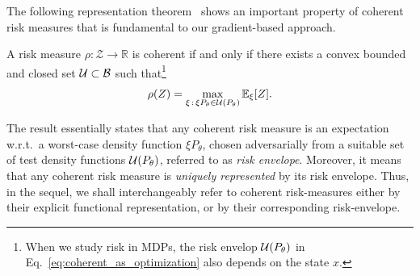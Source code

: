 \documentclass{article} %
\begin{document}
The following representation theorem~\cite{Shapiro2009} shows an important property of coherent risk measures that is fundamental to our gradient-based approach.
%
\begin{theorem}
\label{thm:rep}
A risk measure $\rho:\mathcal Z \rightarrow \mathbb R$ is coherent if and only if there exists a convex bounded and closed set ${\mathcal{U}} \subset \mathcal B$ such that\footnote{When we study risk in MDPs, the risk envelop ${\mathcal{U}}(P_\theta)$ in Eq.~\ref{eq:coherent_as_optimization} also depends on the state $x$.
}%
%
\begin{equation}
\label{eq:coherent_as_optimization}
\rho(Z)=\max_{\xi\,:\,\xi P_\theta\in {\mathcal{U}}(P_\theta)} \mathbb E_{\xi}[Z].
\end{equation}
\end{theorem}
%
\vspace{-5pt}
The result essentially states that any coherent risk measure is an expectation w.r.t.~a worst-case density function $\xi P_\theta$, chosen adversarially from a suitable set of test density functions ${\mathcal{U}}(P_\theta)$, referred to as \emph{risk envelope}. Moreover, it means that any coherent risk measure is \emph{uniquely represented} by its risk envelope. Thus, in the sequel, we shall interchangeably refer to coherent risk-measures either by their explicit functional representation, or by their corresponding risk-envelope.
\end{document}
